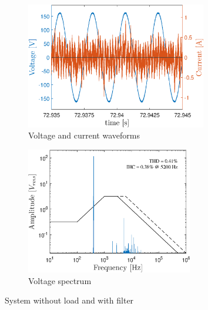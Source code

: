 \begin{doublespacing}
\begin{figure}[!htb] %
	\centering
	\begin{subfigure}[b]{0.5\textwidth}
		\centering
		\includegraphics[height=5.5cm]{Figures/artigo_filt_1.eps}
		\caption{Voltage and current waveforms} 
		\label{fig:artigo_filt_1.eps}
	\end{subfigure}%
	\hfill
	\begin{subfigure}[b]{0.5\textwidth}  
		\centering 
		\includegraphics[height=5.5cm]{Figures/artigo_filt_2.eps}
		\caption{Voltage spectrum}    
		\label{fig:artigo_filt_2.eps}
	\end{subfigure}%
	\caption{System without load and with filter}
	\label{fig:2}
\end{figure}


\end{doublespacing}
